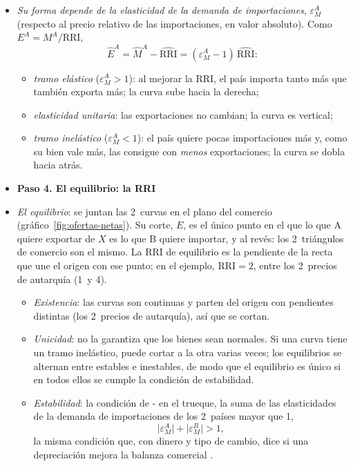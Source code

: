 \documentclass[11pt]{article}
\begin{document}
\begin{itemize}

\item \emph{Su forma depende de la elasticidad de la demanda de importaciones}, $\varepsilon^A_M$ (respecto al precio relativo de las importaciones, en valor absoluto). Como $E^A=M^A/\mathrm{RRI}$,
  \begin{equation}\label{eq:oferta-neta-elasticidad}
  \hat E^A=\hat M^A-\widehat{\mathrm{RRI}}=(\varepsilon^A_M-1)\,\widehat{\mathrm{RRI}}:
  \end{equation}
  \begin{itemize}
  \item \emph{tramo elástico} ($\varepsilon^A_M>1$): al mejorar la RRI, el país importa tanto más que también exporta más; la curva sube hacia la derecha;
  \item \emph{elasticidad unitaria}: las exportaciones no cambian; la curva es vertical;
  \item \emph{tramo inelástico} ($\varepsilon^A_M<1$): el país quiere pocas importaciones más y, como su bien vale más, las consigue con \emph{menos} exportaciones; la curva se dobla hacia atrás.
  \end{itemize}
\item[] \textbf{Paso 4. El equilibrio: la RRI}

\item \emph{El equilibrio}: se juntan las 2~curvas en el plano del comercio (gráfico~\ref{fig:ofertas-netas}). Su corte, $E$, es el único punto en el que lo que A quiere exportar de $X$ es lo que B quiere importar, y al revés: los 2~triángulos de comercio son el mismo. La RRI de equilibrio es la pendiente de la recta que une el origen con ese punto; en el ejemplo, $\mathrm{RRI}=2$, entre los 2~precios de autarquía (1~y 4).
  \begin{itemize}
  \item \emph{Existencia}: las curvas son continuas y parten del origen con pendientes distintas (los 2~precios de autarquía), así que se cortan.
  \item \emph{Unicidad}: no la garantiza que los bienes sean normales. Si una curva tiene un tramo inelástico, puede cortar a la otra varias veces; los equilibrios se alternan entre estables e inestables, de modo que el equilibrio es único si en todos ellos se cumple la condición de estabilidad.
  \item \emph{Estabilidad}: la condición de - en el trueque, la suma de las elasticidades de la demanda de importaciones de los 2~países mayor que 1,
    \begin{equation}\label{eq:ml-trueque}
    \lvert\varepsilon^A_M\rvert+\lvert\varepsilon^B_M\rvert>1,
    \end{equation}
    la misma condición que, con dinero y tipo de cambio, dice si una depreciación mejora la balanza comercial .
  \end{itemize}
\end{itemize}
\end{document}
